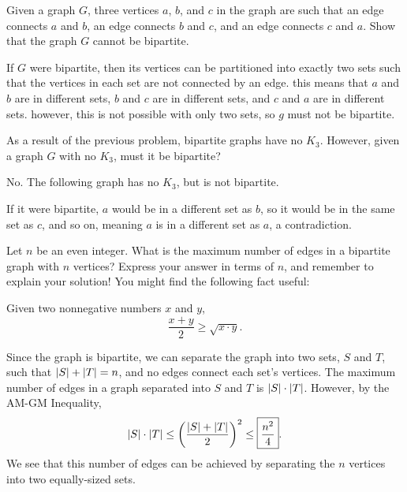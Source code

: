 \documentclass[11pt]{article}
\begin{document}
\begin{problem} %
Given a graph $G$, three vertices $a$, $b$, and $c$ in the graph are such that an edge connects $a$ and $b$, an edge connects $b$ and $c$, and an edge
connects $c$ and $a$. Show that the graph $G$ cannot be bipartite.
\end{problem}

\begin{solution}
If $G$ were bipartite, then its vertices can be partitioned into exactly two sets such that the vertices in each set are not connected by an edge.
this means that $a$ and $b$ are in different sets, $b$ and $c$ are in different sets, and $c$ and $a$ are in different sets. however, this is not possible
with only two sets, so $g$ must not be bipartite.
\end{solution}

\begin{problem} %
As a result of the previous problem, bipartite graphs have no $K_3$. However, given a graph $G$ with no $K_3$, must it be bipartite?
\end{problem}

\begin{solution}
No. The following graph has no $K_3$, but is not bipartite.
\begin{center}
\end{center}
If it were bipartite, $a$ would be in a different set as $b$, so it would be in the same set as $c$, and so on, meaning $a$ is in a different set as $a$, a contradiction.
\end{solution}

\begin{problem} %
Let $n$ be an even integer. What is the maximum number of edges in a bipartite graph with $n$ vertices? Express your answer
in terms of $n$, and remember to explain your solution! You might find the following fact useful:
\begin{theorem}[AM-GM]
\label{thm:am-gm}
Given two nonnegative numbers $x$ and $y$,
\[\frac{x + y}{2} \ge \sqrt{x \cdot y}.\]
\end{theorem}
\end{problem}

\begin{solution}
Since the graph is bipartite, we can separate the graph into two sets, $S$ and $T$, such that $\left\lvert S \right\rvert + \left\lvert T \right\rvert = n$,
and no edges connect each set's vertices. The maximum number of edges in a graph separated into $S$ and $T$ is $\left\lvert S \right\rvert \cdot \left\lvert T \right\rvert$. However, by the
AM-GM Inequality,
\[\left\lvert S \right\rvert \cdot \left\lvert T \right\rvert \le \left(\frac{\left\lvert S \right\rvert + \left\lvert T \right\rvert}{2}\right)^2 \le \boxed{\frac{n^2}{4}}. \]
We see that this number of edges can be achieved by separating the $n$ vertices into two equally-sized sets.
\end{solution}
\end{document}

